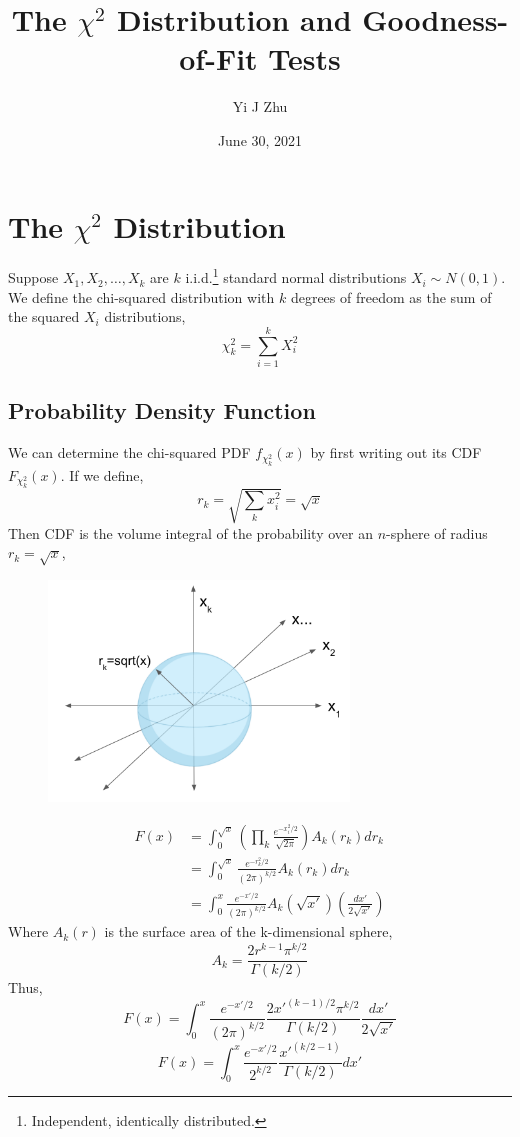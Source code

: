 \documentclass[12pt]{article}
\author{Yi J Zhu}
\title{The $\chi^2$ Distribution and Goodness-of-Fit Tests}
\date{June 30, 2021}
\numberwithin{equation}{section}
\theoremstyle{definition}
\begin{document}
\maketitle

\section{The $\chi^2$ Distribution }
Suppose $X_1, X_2, \dots, X_k$ are $k$ i.i.d.\footnote{Independent, identically distributed.} standard normal distributions $X_i\sim N(0,1)$. We define the chi-squared distribution with $k$ degrees of freedom as the sum of the squared $X_i$ distributions,
\begin{equation}
		\chi^2_k = \sum_{i=1}^{k} X_i^2
\end{equation}

\subsection{Probability Density Function}

We can determine the chi-squared PDF $f_{\chi^2_k}(x)$ by first writing out its CDF $F_{\chi^2_k}(x)$. If we define,
\begin{equation}
		r_k = \sqrt{\sum_k x_i^2} = \sqrt{x}
\end{equation}
Then CDF is the volume integral of the probability over an $n$-sphere of radius $r_k=\sqrt{x}$,
\begin{figure}[H]
	\centering
	\includegraphics[width=8cm] {sphere}
\end{figure}
\begin{align}
		F(x) &= \int_0^{\sqrt{x} }\left(\prod_k \frac{e^{-x_i^2/2}}{\sqrt{2 \pi}}  \right) A_k(r_k)dr_k\\
		& = \int_0^{\sqrt{x}} \frac{e^{-r_k^2/2}}{(2\pi)^{k/2}}A_k(r_k)dr_k \\
		&= \int_0^x  \frac{e^{-x'/2}}{(2\pi)^{k/2}}A_k\left(\sqrt{x'}\right)\left(\frac{dx'}{2\sqrt{x'}}\right)
\end{align}
Where $A_k(r)$ 	is the surface area of the k-dimensional sphere,
\begin{equation}
		A_k = \frac{2 r^{k-1}\pi^{k/2}}{\Gamma(k/2)}
\end{equation}
Thus,
\begin{equation}
		F(x) = \int_0^x  \frac{e^{-x'/2}}{(2\pi)^{k/2}} \frac{2 x'^{(k-1)/2}\pi^{k/2}}{\Gamma(k/2)} \frac{dx'}{2\sqrt{x'}}
\end{equation}
\begin{equation}
		F(x) = \int_0^x  \frac{e^{-x'/2}}{2^{k/2}} \frac{x'^{(k/2-1)}}{\Gamma(k/2)} dx'
\end{equation}
\end{document}
